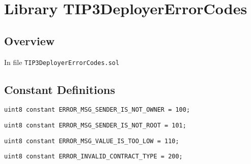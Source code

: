 
\chapter{Library TIP3DeployerErrorCodes}

\minitoc

\section{Overview}


In file {\tt TIP3DeployerErrorCodes.sol}

\section{Constant Definitions}


\begin{lstlisting}[firstnumber=4]
    uint8 constant ERROR_MSG_SENDER_IS_NOT_OWNER = 100;
\end{lstlisting}

\begin{lstlisting}[firstnumber=5]
    uint8 constant ERROR_MSG_SENDER_IS_NOT_ROOT = 101;
\end{lstlisting}

\begin{lstlisting}[firstnumber=7]
    uint8 constant ERROR_MSG_VALUE_IS_TOO_LOW = 110;
\end{lstlisting}

\begin{lstlisting}[firstnumber=9]
    uint8 constant ERROR_INVALID_CONTRACT_TYPE = 200;
\end{lstlisting}
